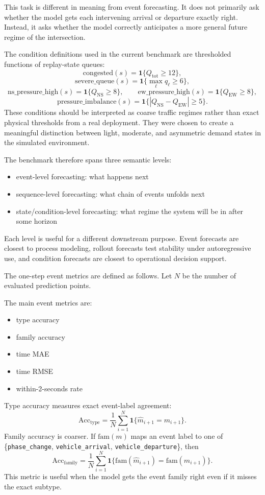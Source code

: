 \documentclass[11pt]{article}
\begin{document}
This task is different in meaning from event forecasting. It does not primarily ask whether the model gets each intervening arrival or departure exactly right. Instead, it asks whether the model correctly anticipates a more general future regime of the intersection.

The condition definitions used in the current benchmark are thresholded functions of replay-state queues:
\[
\mathrm{congested}(s) = \mathbf{1}\{Q_{\mathrm{tot}} \ge 12\},
\]
\[
\mathrm{severe\_queue}(s) = \mathbf{1}\{\max_{\ell} q_\ell \ge 6\},
\]
\[
\mathrm{ns\_pressure\_high}(s) = \mathbf{1}\{Q_{\mathrm{NS}} \ge 8\},
\qquad
\mathrm{ew\_pressure\_high}(s) = \mathbf{1}\{Q_{\mathrm{EW}} \ge 8\},
\]
\[
\mathrm{pressure\_imbalance}(s) = \mathbf{1}\{|Q_{\mathrm{NS}} - Q_{\mathrm{EW}}| \ge 5\}.
\]
These conditions should be interpreted as coarse traffic regimes rather than exact physical thresholds from a real deployment. They were chosen to create a meaningful distinction between light, moderate, and asymmetric demand states in the simulated environment.

The benchmark therefore spans three semantic levels:
\begin{itemize}
  \item event-level forecasting: what happens next
  \item sequence-level forecasting: what chain of events unfolds next
  \item state/condition-level forecasting: what regime the system will be in after some horizon
\end{itemize}
Each level is useful for a different downstream purpose. Event forecasts are closest to process modeling, rollout forecasts test stability under autoregressive use, and condition forecasts are closest to operational decision support.

The one-step event metrics are defined as follows. Let \(N\) be the number of evaluated prediction points.

The main event metrics are:
\begin{itemize}
  \item type accuracy
  \item family accuracy
  \item time MAE
  \item time RMSE
  \item within-2-seconds rate
\end{itemize}

Type accuracy measures exact event-label agreement:
\[
\mathrm{Acc}_{\mathrm{type}} =
\frac{1}{N}\sum_{i=1}^{N}\mathbf{1}\{\hat{m}_{i+1}=m_{i+1}\}.
\]
Family accuracy is coarser. If \(\mathrm{fam}(m)\) maps an event label to one of \{\texttt{phase\_change}, \texttt{vehicle\_arrival}, \texttt{vehicle\_departure}\}, then
\[
\mathrm{Acc}_{\mathrm{family}} =
\frac{1}{N}\sum_{i=1}^{N}
\mathbf{1}\{\mathrm{fam}(\hat{m}_{i+1})=\mathrm{fam}(m_{i+1})\}.
\]
This metric is useful when the model gets the event family right even if it misses the exact subtype.
\end{document}
